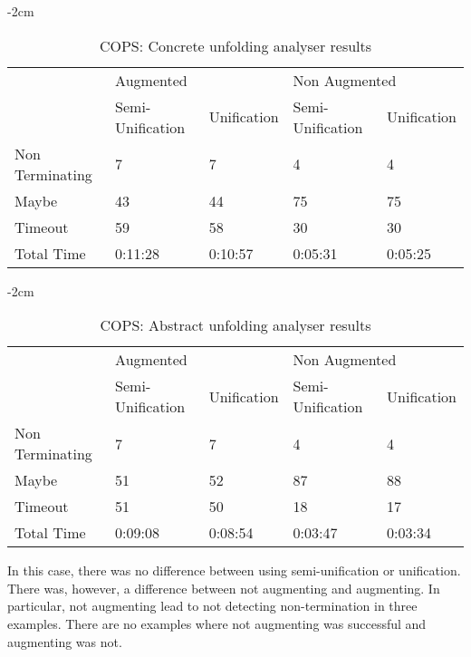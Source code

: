 \begin{table}[ht]
    \centering
    \addtolength{\leftskip} {-2cm}
    \addtolength{\rightskip}{-2cm}

    \begin{tabular}{|l|l|l|l|l|}
    \cline{2-5} 
    \multicolumn{1}{c|}{} & \multicolumn{2}{l|}{Augmented} & \multicolumn{2}{l|}{Non Augmented} \\ \cline{2-5} 
    \multicolumn{1}{c|}{} & Semi-Unification & Unification & Semi-Unification & Unification \\ \hline
    Non Terminating & 7 & 7 & 4 & 4 \\ \hline
    Maybe & 43 & 44 & 75 & 75\\ \hline
    Timeout & 59 & 58 & 30 & 30 \\ \hline
    Total Time & 0:11:28 & 0:10:57 & 0:05:31 & 0:05:25 \\ \hline
    \end{tabular}
    \caption{COPS: Concrete unfolding analyser results}
\label{tab:hot:conc}

\end{table}
\begin{table}[ht]
    \centering
    \addtolength{\leftskip} {-2cm}
    \addtolength{\rightskip}{-2cm}

    \begin{tabular}{|l|l|l|l|l|}
    \cline{2-5} 
    \multicolumn{1}{c|}{} & \multicolumn{2}{l|}{Augmented} & \multicolumn{2}{l|}{Non Augmented} \\ \cline{2-5} 
    \multicolumn{1}{c|}{} & Semi-Unification & Unification & Semi-Unification & Unification \\ \hline
    Non Terminating & 7 & 7 & 4 & 4 \\ \hline
    Maybe & 51 & 52 & 87 & 88 \\ \hline
    Timeout & 51 & 50 & 18 & 17 \\ \hline
    Total Time & 0:09:08 & 0:08:54 & 0:03:47 & 0:03:34 \\ \hline
    \end{tabular}
    \caption{COPS: Abstract unfolding analyser results}
    \label{tab:hot:abst}
\end{table}

In this case, there was no difference between using semi-unification or unification. There was, however, a difference between not augmenting and augmenting. In particular, not augmenting lead to not detecting non-termination in three examples. There are no examples where not augmenting was successful and augmenting was not.